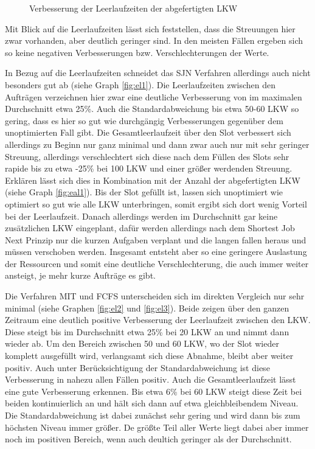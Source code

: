 \begin{figure}[H]
\caption{Verbesserung der Leerlaufzeiten der abgefertigten LKW}
\label{fig:evalLeerlaufzeit}
\end{figure}

Mit Blick auf die Leerlaufzeiten lässt sich feststellen, dass die Streuungen hier zwar vorhanden, aber deutlich geringer sind. In den meisten Fällen ergeben sich so keine negativen Verbesserungen bzw. Verschlechterungen der Werte.

In Bezug auf die Leerlaufzeiten schneidet das SJN Verfahren allerdings auch nicht besonders gut ab (siehe Graph \ref{fig:el1}). Die Leerlaufzeiten zwischen den Aufträgen verzeichnen hier zwar eine deutliche Verbesserung von im maximalen Durchschnitt etwa 25\%. Auch die Standardabweichung bis etwa 50-60 LKW so gering, dass es hier so gut wie durchgängig Verbesserungen gegenüber dem unoptimierten Fall gibt. Die Gesamtleerlaufzeit über den Slot verbessert sich allerdings zu Beginn nur ganz minimal und dann zwar auch nur mit sehr geringer Streuung, allerdings verschlechtert sich diese nach dem Füllen des Slots sehr rapide bis zu etwa -25\% bei 100 LKW und einer größer werdenden Streuung. Erklären lässt sich dies in Kombination mit der Anzahl der abgefertigten LKW (siehe Graph \ref{fig:eal1}). Bis der Slot gefüllt ist, lassen sich unoptimiert wie optimiert so gut wie alle LKW unterbringen, somit ergibt sich dort wenig Vorteil bei der Leerlaufzeit. Danach allerdings werden im Durchschnitt gar keine zusätzlichen LKW eingeplant, dafür werden allerdings nach dem Shortest Job Next Prinzip nur die kurzen Aufgaben verplant und die langen fallen heraus und müssen verschoben werden. Insgesamt entsteht aber so eine geringere Auslastung der Ressourcen und somit eine deutliche Verschlechterung, die auch immer weiter ansteigt, je mehr kurze Aufträge es gibt.

Die Verfahren MIT und FCFS unterscheiden sich im direkten Vergleich nur sehr minimal (siehe Graphen \ref{fig:el2} und \ref{fig:el3}). Beide zeigen über den ganzen Zeitraum eine deutlich positive Verbesserung der Leerlaufzeit zwischen den LKW. Diese steigt bis im Durchschnitt etwa 25\% bei 20 LKW an und nimmt dann wieder ab. Um den Bereich zwischen 50 und 60 LKW, wo der Slot wieder komplett ausgefüllt wird, verlangsamt sich diese Abnahme, bleibt aber weiter positiv. Auch unter Berücksichtigung der Standardabweichung ist diese Verbesserung in nahezu allen Fällen positiv. Auch die Gesamtleerlaufzeit lässt eine gute Verbesserung erkennen. Bis etwa 6\% bei 60 LKW steigt diese Zeit bei beiden kontinuierlich an und hält sich dann auf etwa gleichbleibendem Niveau. Die Standardabweichung ist dabei zunächst sehr gering und wird dann bis zum höchsten Niveau immer größer. De größte Teil aller Werte liegt dabei aber immer noch im positiven Bereich, wenn auch deultich geringer als der Durchschnitt.

